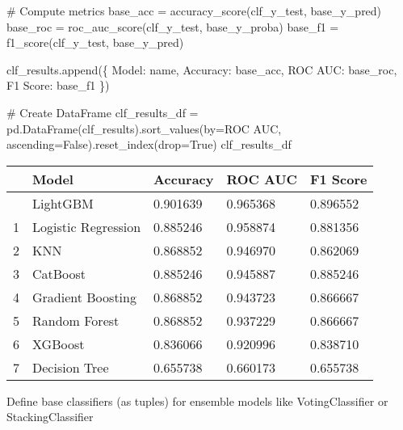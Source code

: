 \documentclass[
  letterpaper,
  DIV=11,
  numbers=noendperiod]{scrreprt}
\newenvironment{Shaded}{\begin{snugshade}}{\end{snugshade}}
\newcommand{\CommentTok}[1]{\textcolor[rgb]{0.37,0.37,0.37}{#1}}
\newcommand{\NormalTok}[1]{\textcolor[rgb]{0.00,0.23,0.31}{#1}}
\newcommand{\OperatorTok}[1]{\textcolor[rgb]{0.37,0.37,0.37}{#1}}
\newcommand{\StringTok}[1]{\textcolor[rgb]{0.13,0.47,0.30}{#1}}
\newcommand{\VariableTok}[1]{\textcolor[rgb]{0.07,0.07,0.07}{#1}}
\begin{document}
\begin{Shaded}
\begin{Highlighting}[]
    \CommentTok{\# Compute metrics}
\NormalTok{    base\_acc }\OperatorTok{=}\NormalTok{ accuracy\_score(clf\_y\_test, base\_y\_pred)}
\NormalTok{    base\_roc }\OperatorTok{=}\NormalTok{ roc\_auc\_score(clf\_y\_test, base\_y\_proba)}
\NormalTok{    base\_f1 }\OperatorTok{=}\NormalTok{ f1\_score(clf\_y\_test, base\_y\_pred)}
    
\NormalTok{    clf\_results.append(\{}
        \StringTok{\textquotesingle{}Model\textquotesingle{}}\NormalTok{: name,}
        \StringTok{\textquotesingle{}Accuracy\textquotesingle{}}\NormalTok{: base\_acc,}
        \StringTok{\textquotesingle{}ROC AUC\textquotesingle{}}\NormalTok{: base\_roc,}
        \StringTok{\textquotesingle{}F1 Score\textquotesingle{}}\NormalTok{: base\_f1}
\NormalTok{    \})}

\CommentTok{\# Create DataFrame}
\NormalTok{clf\_results\_df }\OperatorTok{=}\NormalTok{ pd.DataFrame(clf\_results).sort\_values(by}\OperatorTok{=}\StringTok{\textquotesingle{}ROC AUC\textquotesingle{}}\NormalTok{, ascending}\OperatorTok{=}\VariableTok{False}\NormalTok{).reset\_index(drop}\OperatorTok{=}\VariableTok{True}\NormalTok{)}
\NormalTok{clf\_results\_df}
\end{Highlighting}
\end{Shaded}

\begin{longtable}[]{@{}lllll@{}}
\toprule\noalign{}
& Model & Accuracy & ROC AUC & F1 Score \\
\midrule\noalign{}
\endhead
\bottomrule\noalign{}
\endlastfoot
0 & LightGBM & 0.901639 & 0.965368 & 0.896552 \\
1 & Logistic Regression & 0.885246 & 0.958874 & 0.881356 \\
2 & KNN & 0.868852 & 0.946970 & 0.862069 \\
3 & CatBoost & 0.885246 & 0.945887 & 0.885246 \\
4 & Gradient Boosting & 0.868852 & 0.943723 & 0.866667 \\
5 & Random Forest & 0.868852 & 0.937229 & 0.866667 \\
6 & XGBoost & 0.836066 & 0.920996 & 0.838710 \\
7 & Decision Tree & 0.655738 & 0.660173 & 0.655738 \\
\end{longtable}

Define base classifiers (as tuples) for ensemble models like
VotingClassifier or StackingClassifier
\end{document}
